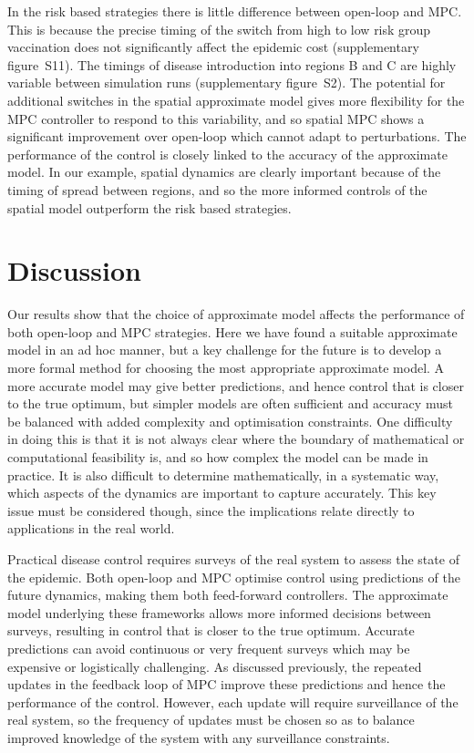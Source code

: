In the risk based strategies there is little difference between open-loop and MPC. This is because the precise timing of the switch from high to low risk group vaccination does not significantly affect the epidemic cost (supplementary figure~S11). The timings of disease introduction into regions B and C are highly variable between simulation runs (supplementary figure~S2). The potential for additional switches in the spatial approximate model gives more flexibility for the MPC controller to respond to this variability, and so spatial MPC shows a significant improvement over open-loop which cannot adapt to perturbations. The performance of the control is closely linked to the accuracy of the approximate model. In our example, spatial dynamics are clearly important because of the timing of spread between regions, and so the more informed controls of the spatial model outperform the risk based strategies.

\section{Discussion}
\label{sec:Discussion}

Our results show that the choice of approximate model affects the performance of both open-loop and MPC strategies. Here we have found a suitable approximate model in an ad hoc manner, but a key challenge for the future is to develop a more formal method for choosing the most appropriate approximate model. A more accurate model may give better predictions, and hence control that is closer to the true optimum, but simpler models are often sufficient \citep{thompson_effect_2018} and accuracy must be balanced with added complexity and optimisation constraints. One difficulty in doing this is that it is not always clear where the boundary of mathematical or computational feasibility is, and so how complex the model can be made in practice. It is also difficult to determine mathematically, in a systematic way, which aspects of the dynamics are important to capture accurately. This key issue must be considered though, since the implications relate directly to applications in the real world.

Practical disease control requires surveys of the real system to assess the state of the epidemic. Both open-loop and MPC optimise control using predictions of the future dynamics, making them both feed-forward controllers. The approximate model underlying these frameworks allows more informed decisions between surveys, resulting in control that is closer to the true optimum. Accurate predictions can avoid continuous or very frequent surveys which may be expensive or logistically challenging. As discussed previously, the repeated updates in the feedback loop of MPC improve these predictions and hence the performance of the control. However, each update will require surveillance of the real system, so the frequency of updates must be chosen so as to balance improved knowledge of the system with any surveillance constraints.

